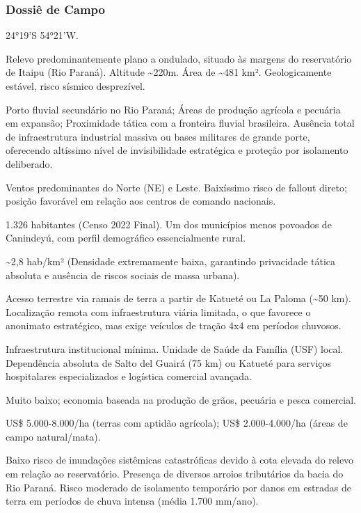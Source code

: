 \subsubsection{Dossiê de Campo}
\begin{description}[style=nextline,leftmargin=0.5cm,font=\bfseries]
\item[Coordenadas]  24°19'S 54°21'W.
\item[Topografia]  Relevo predominantemente plano a ondulado, situado às margens do reservatório de Itaipu (Rio Paraná). Altitude \textasciitilde 220m. Área de \textasciitilde 481 km². Geologicamente estável, risco sísmico desprezível.
\item[Alvos Estratégicos]  Porto fluvial secundário no Rio Paraná; Áreas de produção agrícola e pecuária em expansão; Proximidade tática com a fronteira fluvial brasileira. Ausência total de infraestrutura industrial massiva ou bases militares de grande porte, oferecendo altíssimo nível de invisibilidade estratégica e proteção por isolamento deliberado.
\item[Fallout]  Ventos predominantes do Norte (NE) e Leste. Baixíssimo risco de fallout direto; posição favorável em relação aos centros de comando nacionais.
\item[População]  1.326 habitantes (Censo 2022 Final). Um dos municípios menos povoados de Canindeyú, com perfil demográfico essencialmente rural.
\item[Densidade]  \textasciitilde 2,8 hab/\allowbreak km² (Densidade extremamente baixa, garantindo privacidade tática absoluta e ausência de riscos sociais de massa urbana).
\item[Vias de Acesso]  Acesso terrestre via ramais de terra a partir de Katueté ou La Paloma (\textasciitilde 50 km). Localização remota com infraestrutura viária limitada, o que favorece o anonimato estratégico, mas exige veículos de tração 4x4 em períodos chuvosos.
\item[Serviços]  Infraestrutura institucional mínima. Unidade de Saúde da Família (USF) local. Dependência absoluta de Salto del Guairá (75 km) ou Katueté para serviços hospitalares especializados e logística comercial avançada.
\item[Custo de Vida]  Muito baixo; economia baseada na produção de grãos, pecuária e pesca comercial.
\item[Preço da Terra]  US\$ 5.000-8.000/\allowbreak ha (terras com aptidão agrícola); US\$ 2.000-4.000/\allowbreak ha (áreas de campo natural/\allowbreak mata).
\item[Hidrologia]  Baixo risco de inundações sistêmicas catastróficas devido à cota elevada do relevo em relação ao reservatório. Presença de diversos arroios tributários da bacia do Rio Paraná. Risco moderado de isolamento temporário por danos em estradas de terra em períodos de chuva intensa (média 1.700 mm/\allowbreak ano).

\end{description}
